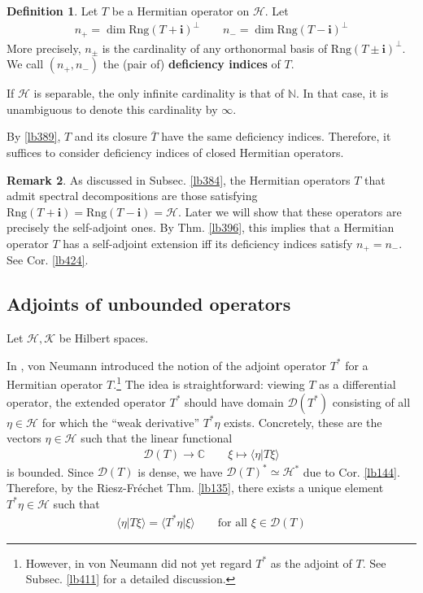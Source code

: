 \documentclass[12pt,b5paper,notitlepage]{article}
\theoremstyle{definition}
\newtheorem{df}{Definition}[subsection]
\newtheorem{rem}[df]{Remark}
\theoremstyle{plain}
\newcommand{\ovl}{\overline}
\newcommand{\Dom}{\mathscr{D}}
\newcommand{\bk}[1]{\langle {#1}\rangle}
\newcommand{\im}{\mathbf{i}}
\newcommand{\Cbb}{\mathbb C}
\newcommand{\Nbb}{\mathbb N}
\newcommand{\Rng}{\mathrm{Rng}}
\newcommand{\MH}{\mathcal H}
\newcommand{\MK}{\mathcal K}
\numberwithin{equation}{section}
\begin{document}
\begin{df}
Let $T$ be a Hermitian operator on $\MH$. Let
\begin{align*}
n_+=\dim \Rng(T+\im)^\perp\qquad n_-=\dim\Rng(T-\im)^\perp
\end{align*}
More precisely, $n_\pm$ is the cardinality of any orthonormal basis of $\Rng(T\pm\im)^\perp$. We call $(n_+,n_-)$ the (pair of) \textbf{deficiency indices}  of $T$. 
\end{df}

If $\MH$ is separable, the only infinite cardinality is that of $\Nbb$. In that case, it is unambiguous to denote this cardinality by $\infty$.


By \ref{lb389}, $T$ and its closure $\ovl T$ have the same deficiency indices. Therefore, it suffices to consider deficiency indices of closed Hermitian operators.


\begin{rem}
As discussed in Subsec. \ref{lb384}, the Hermitian operators $T$ that admit spectral decompositions are those satisfying $\Rng(T+\im)=\Rng(T-\im)=\MH$. Later we will show that these operators are precisely the self-adjoint ones. By Thm. \ref{lb396}, this implies that a Hermitian operator $T$ has a self-adjoint extension iff its deficiency indices satisfy $n_+=n_-$. See Cor. \ref{lb424}.
\end{rem} 



\subsection{Adjoints of unbounded operators}


Let $\MH,\MK$ be Hilbert spaces.


In \cite{vN29a}, von Neumann introduced the notion of the adjoint operator $T^*$ for a Hermitian operator $T$.\footnote{However, in \cite{vN29a} von Neumann did not yet regard $T^*$ as the adjoint of $T$. See Subsec. \ref{lb411} for a detailed discussion.} The idea is straightforward: viewing $T$ as a differential operator, the extended operator $T^*$ should have domain $\Dom(T^*)$ consisting of all $\eta\in\MH$ for which the ``weak derivative'' $T^*\eta$ exists. Concretely, these are the vectors $\eta\in\MH$ such that the linear functional
\begin{align}\label{eq203}
\Dom(T)\rightarrow\Cbb\qquad \xi\mapsto\bk{\eta|T\xi}
\end{align}
is bounded. Since $\Dom(T)$ is dense, we have $\Dom(T)^*\simeq\MH^*$ due to Cor. \ref{lb144}. Therefore, by the Riesz-Fr\'echet Thm. \ref{lb135}, there exists a unique element $T^*\eta\in\MH$ such that
\begin{align*}
\bk{\eta|T\xi}=\bk{T^*\eta|\xi}\qquad\text{for all }\xi\in\Dom(T)
\end{align*}
\end{document}
